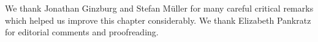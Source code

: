 \documentclass[output=paper,biblatex,babelshorthands,newtxmath,draftmode,colorlinks,citecolor=brown]{langscibook}
\begin{document}

\section*{\acknowledgmentsUS}

We thank Jonathan Ginzburg and Stefan Müller for many careful critical remarks which helped
us improve this chapter considerably. We thank
Elizabeth Pankratz for editorial comments and proofreading.


{\sloppy
\printbibliography[heading=subbibliography,notkeyword=this] 
}
\end{document}
